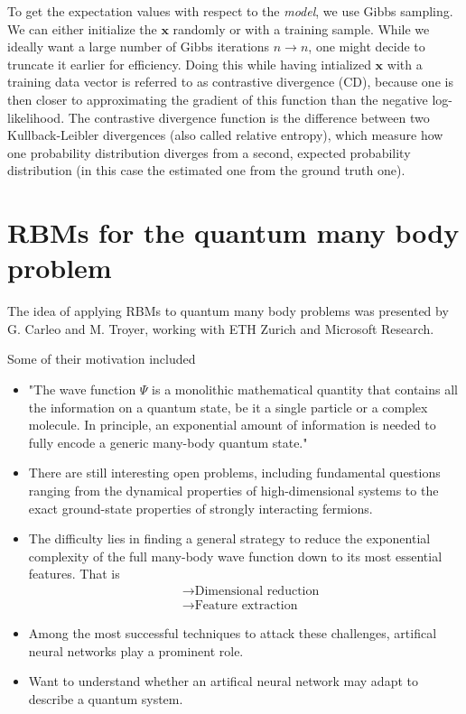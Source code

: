 \documentclass[norsk,a4paper,11pt]{article}
\begin{document}
To get the expectation values with respect to the \textit{model}, we use Gibbs sampling. We can either initialize the $\bm{x}$ randomly or with a training sample. While we ideally want a large number of Gibbs iterations $n\rightarrow n$, one might decide to truncate it earlier for efficiency. Doing this while having intialized $\bm{x}$ with a training data vector is referred to as contrastive divergence (CD), because one is then closer to approximating the gradient of this function than the negative log-likelihood. The contrastive divergence function is the difference between two Kullback-Leibler divergences (also called relative entropy), which measure how one probability distribution diverges from a second, expected probability distribution (in this case the estimated one from the ground truth one).

\section{RBMs for the quantum many body problem}
The idea of applying RBMs to quantum many body problems was presented by G. Carleo and M. Troyer, working with ETH Zurich and Microsoft Research.

Some of their motivation included
\begin{itemize}
	\item "The wave function $\Psi$ is a monolithic mathematical quantity that contains all the information on a quantum state, be it a single particle or a complex molecule. In principle, an exponential amount of information is needed to fully encode a generic many-body quantum state."
	\item There are still interesting open problems, including fundamental questions ranging from the dynamical properties of high-dimensional systems to the exact ground-state properties of strongly interacting fermions.
	\item The difficulty lies in finding a general strategy to reduce the exponential complexity of the full many-body wave function down to its most essential features. That is
	\begin{align}
		&\rightarrow \text{Dimensional reduction} \\
		&\rightarrow \text{Feature extraction}
	\end{align}
	\item Among the most successful techniques to attack these challenges, artifical neural networks play a prominent role.
	\item Want to understand whether an artifical neural network may adapt to describe a quantum system.
\end{itemize}
\end{document}
